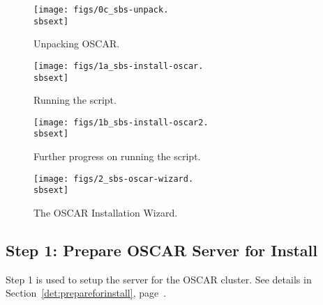 
\begin{figure}[htbp]
  \begin{center}
    \centerline{\texttt{[image: figs/0c\_sbs-unpack.\\sbsext]}}
    \caption{Unpacking OSCAR.}
    \label{fig:sbs-unpacking-oscar}
  \end{center}
\end{figure}

\begin{figure}[htbp]
  \begin{center}
    \centerline{\texttt{[image: figs/1a\_sbs-install-oscar.\\sbsext]}}
    \caption{Running the  script.}
    \label{fig:sbs-install-oscar}
  \end{center}
\end{figure}

\begin{figure}[htbp]
  \begin{center}
    \centerline{\texttt{[image: figs/1b\_sbs-install-oscar2.\\sbsext]}}
    \caption{Further progress on running the 
      script.}
    \label{fig:sbs-install-oscar2}
  \end{center}
\end{figure}

\begin{figure}[htbp]
  \begin{center}
    \centerline{\texttt{[image: figs/2\_sbs-oscar-wizard.\\sbsext]}}
    \caption{The OSCAR Installation Wizard.}
    \label{fig:sbs-install-wizard}
  \end{center}
\end{figure}

\clearpage



\subsection{Step 1: Prepare OSCAR Server for Install}

Step 1 is used to setup the server for the OSCAR cluster.  See details
in Section~\ref{det:prepareforinstall},
page~\pageref{det:prepareforinstall}. 

